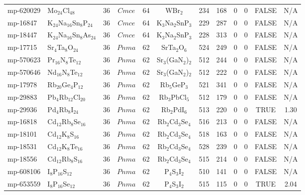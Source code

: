 {\begin{longtable}{llcccccccccc}
    mp-620029 & Mo$_{24}$Cl$_{48}$ & 36    & $Cmce$ & 64    & WBr$_{2}$ & 234   & 168   & 0     & 0     & FALSE & N/A \\
    mp-16847 & K$_{24}$Na$_{16}$Sn$_{8}$P$_{24}$ & 36    & $Cmce$ & 64    & K$_{3}$Na$_{2}$SnP$_{3}$ & 229   & 287   & 0     & 0     & FALSE & N/A \\
    mp-18447 & K$_{24}$Na$_{16}$Sn$_{8}$As$_{24}$ & 36    & $Cmce$ & 64    & K$_{3}$Na$_{2}$SnP$_{3}$ & 228   & 313   & 0     & 0     & FALSE & N/A \\
    mp-17715 & Sr$_{4}$Ta$_{8}$O$_{24}$ & 36    & $Pnma$ & 62    & SrTa$_{2}$O$_{6}$ & 524   & 249   & 0     & 0     & FALSE & N/A \\
    mp-570623 & Pr$_{16}$N$_{8}$Te$_{12}$ & 36    & $Pnma$ & 62    & Sr$_{3}$(GaN$_{2}$)$_{2}$ & 512   & 244   & 0     & 0     & FALSE & N/A \\
    mp-570646 & Nd$_{16}$N$_{8}$Te$_{12}$ & 36    & $Pnma$ & 62    & Sr$_{3}$(GaN$_{2}$)$_{2}$ & 512   & 222   & 0     & 0     & FALSE & N/A \\
    mp-17978 & Rb$_{20}$Ge$_{4}$P$_{12}$ & 36    & $Pnma$ & 62    & Rb$_{5}$GeP$_{3}$ & 521   & 341   & 0     & 0     & FALSE & N/A \\
    mp-29883 & Pb$_{4}$Rb$_{12}$Cl$_{20}$ & 36    & $Pnma$ & 62    & Rb$_{3}$PbCl$_{5}$ & 512   & 179   & 0     & 0     & FALSE & N/A \\
    mp-29936 & Pd$_{4}$Rb$_{8}$I$_{24}$ & 36    & $Pnma$ & 62    & Rb$_{2}$PdI$_{6}$ & 513   & 220   & 0     & 0     & TRUE  & 1.30  \\
    mp-16818 & Cd$_{12}$Rb$_{8}$Se$_{16}$ & 36    & $Pnma$ & 62    & Rb$_{2}$Cd$_{3}$Se$_{4}$ & 516   & 213   & 0     & 0     & FALSE & N/A \\
    mp-18101 & Cd$_{12}$K$_{8}$S$_{16}$ & 36    & $Pnma$ & 62    & Rb$_{2}$Cd$_{3}$Se$_{4}$ & 518   & 163   & 0     & 0     & FALSE & N/A \\
    mp-18531 & Cd$_{12}$K$_{8}$Te$_{16}$ & 36    & $Pnma$ & 62    & Rb$_{2}$Cd$_{3}$Se$_{4}$ & 528   & 239   & 0     & 0     & FALSE & N/A \\
    mp-18556 & Cd$_{12}$Rb$_{8}$S$_{16}$ & 36    & $Pnma$ & 62    & Rb$_{2}$Cd$_{3}$Se$_{4}$ & 515   & 214   & 0     & 0     & FALSE & N/A \\
    mp-608106 & I$_{8}$P$_{16}$S$_{12}$ & 36    & $Pnma$ & 62    & P$_{4}$S$_{3}$I$_{2}$ & 510   & 141   & 0     & 0     & FALSE & N/A \\
    mp-653559 & I$_{8}$P$_{16}$Se$_{12}$ & 36    & $Pnma$ & 62    & P$_{4}$S$_{3}$I$_{2}$ & 515   & 115   & 0     & 0     & TRUE  & 2.04  \\

\end{longtable}}
